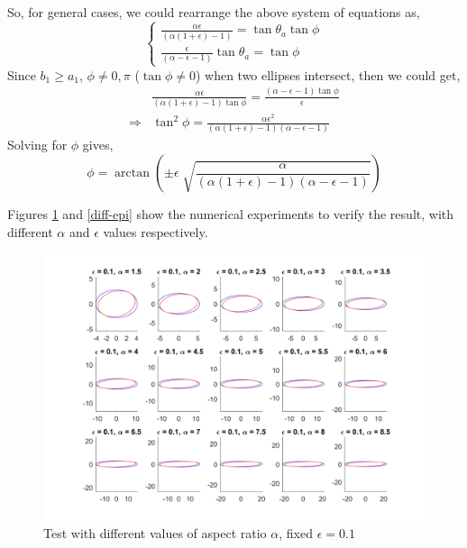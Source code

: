 \documentclass{article}
\begin{document}
So, for general cases, we could rearrange the above system of equations as,
\begin{equation}
\left\{
\begin{aligned}
\frac{\alpha \epsilon}{(\alpha(1+\epsilon)-1)} = \tan\theta_a \tan\phi \\
\frac{\epsilon}{(\alpha - \epsilon - 1)} \tan\theta_a = \tan\phi
\end{aligned}
\right.
\end{equation}
Since $b_1 \geq a_1$, $\phi \neq 0, \pi$ ($\tan\phi \neq 0$) when two ellipses intersect, then we could get,
\begin{equation}
\begin{aligned}
& \frac{\alpha \epsilon}{(\alpha(1+\epsilon)-1) \tan\phi} = \frac{(\alpha - \epsilon - 1) \tan\phi}{\epsilon}\\
\Rightarrow & \tan^2\phi = \frac{\alpha \epsilon^2}{(\alpha(1+\epsilon)-1)(\alpha - \epsilon - 1)}
\end{aligned}
\end{equation}
Solving for $\phi$ gives,
\begin{equation}
\phi = \arctan (\pm \epsilon \sqrt[]{\frac{\alpha}{(\alpha(1+\epsilon)-1)(\alpha - \epsilon - 1)}})
\end{equation}

Figures \ref{diff-alpha} and \ref{diff-epi} show the numerical experiments to verify the result, with different $\alpha$ and $\epsilon$ values respectively.

\begin{figure}
\includegraphics[scale = 0.17]{fig/closed-form_maxAngle-test_alpha.png}
\caption{Test with different values of aspect ratio $\alpha$, fixed $\epsilon = 0.1$}
\label{diff-alpha}
\end{figure}
	
\end{document}
